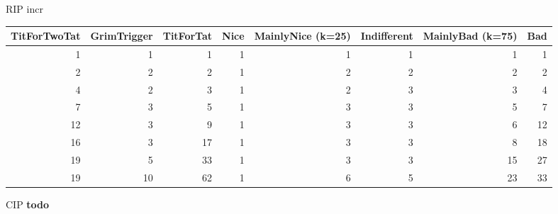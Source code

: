 \documentclass[journal,a4paper,10pt,twoside]{IEEEtran} %
\begin{document}
RIP incr
\begin{tabular}{rrrrrrrr} \toprule
    TitForTwoTat &  GrimTrigger &  TitForTat &  Nice &  MainlyNice (k=25) &  Indifferent &  MainlyBad (k=75) &  Bad \\ \midrule
     1 &   1 &   1 &  1 &  1 &  1 &   1 &   1 \\
     2 &   2 &   2 &  1 &  2 &  2 &   2 &   2 \\
     4 &   2 &   3 &  1 &  2 &  3 &   3 &   4 \\
     7 &   3 &   5 &  1 &  3 &  3 &   5 &   7 \\
    12 &   3 &   9 &  1 &  3 &  3 &   6 &  12 \\
    16 &   3 &  17 &  1 &  3 &  3 &   8 &  18 \\
    19 &   5 &  33 &  1 &  3 &  3 &  15 &  27 \\
    19 &  10 &  62 &  1 &  6 &  5 &  23 &  33 \\ \bottomrule
\end{tabular}

CIP
\textbf{todo}

\balance


\end{document}
